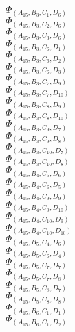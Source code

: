\documentclass[14pt]{article}
\begin{document}
    $\Phi_{({A}_{15}, {B}_{3}, {C}_{1}, {D}_{6})}$ \\ 
    $\Phi_{({A}_{15}, {B}_{3}, {C}_{2}, {D}_{6})}$ \\ 
    $\Phi_{({A}_{15}, {B}_{3}, {C}_{3}, {D}_{6})}$ \\ 
    $\Phi_{({A}_{15}, {B}_{3}, {C}_{6}, {D}_{1})}$ \\ 
    $\Phi_{({A}_{15}, {B}_{3}, {C}_{6}, {D}_{2})}$ \\ 
    $\Phi_{({A}_{15}, {B}_{3}, {C}_{6}, {D}_{3})}$ \\ 
    $\Phi_{({A}_{15}, {B}_{3}, {C}_{7}, {D}_{9})}$ \\ 
    $\Phi_{({A}_{15}, {B}_{3}, {C}_{7}, {D}_{10})}$ \\ 
    $\Phi_{({A}_{15}, {B}_{3}, {C}_{8}, {D}_{9})}$ \\ 
    $\Phi_{({A}_{15}, {B}_{3}, {C}_{8}, {D}_{10})}$ \\ 
    $\Phi_{({A}_{15}, {B}_{3}, {C}_{9}, {D}_{7})}$ \\ 
    $\Phi_{({A}_{15}, {B}_{3}, {C}_{9}, {D}_{8})}$ \\ 
    $\Phi_{({A}_{15}, {B}_{3}, {C}_{10}, {D}_{7})}$ \\ 
    $\Phi_{({A}_{15}, {B}_{3}, {C}_{10}, {D}_{8})}$ \\ 
    $\Phi_{({A}_{15}, {B}_{4}, {C}_{5}, {D}_{6})}$ \\ 
    $\Phi_{({A}_{15}, {B}_{4}, {C}_{6}, {D}_{5})}$ \\ 
    $\Phi_{({A}_{15}, {B}_{4}, {C}_{9}, {D}_{9})}$ \\ 
    $\Phi_{({A}_{15}, {B}_{4}, {C}_{9}, {D}_{10})}$ \\ 
    $\Phi_{({A}_{15}, {B}_{4}, {C}_{10}, {D}_{9})}$ \\ 
    $\Phi_{({A}_{15}, {B}_{4}, {C}_{10}, {D}_{10})}$ \\ 
    $\Phi_{({A}_{15}, {B}_{5}, {C}_{4}, {D}_{6})}$ \\ 
    $\Phi_{({A}_{15}, {B}_{5}, {C}_{6}, {D}_{4})}$ \\ 
    $\Phi_{({A}_{15}, {B}_{5}, {C}_{7}, {D}_{7})}$ \\ 
    $\Phi_{({A}_{15}, {B}_{5}, {C}_{7}, {D}_{8})}$ \\ 
    $\Phi_{({A}_{15}, {B}_{5}, {C}_{8}, {D}_{7})}$ \\ 
    $\Phi_{({A}_{15}, {B}_{5}, {C}_{8}, {D}_{8})}$ \\ 
    $\Phi_{({A}_{15}, {B}_{6}, {C}_{1}, {D}_{1})}$ \\ 
    $\Phi_{({A}_{15}, {B}_{6}, {C}_{1}, {D}_{2})}$ \\ 
\end{document}
